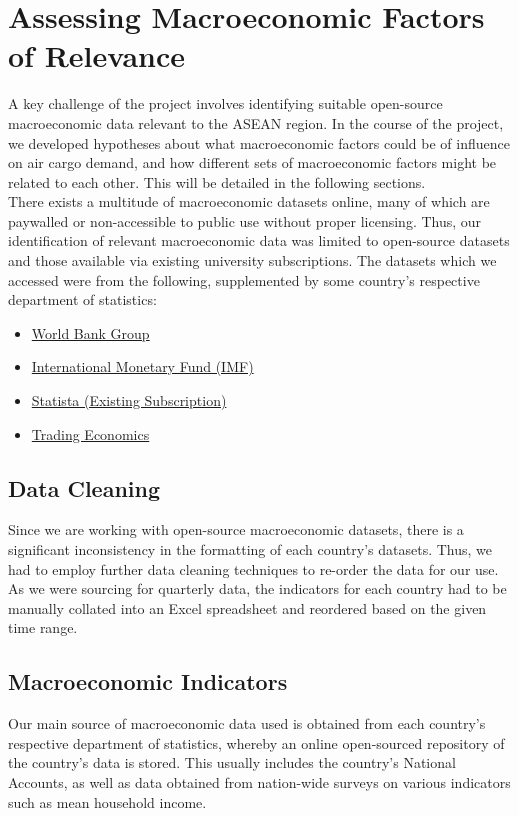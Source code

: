 \documentclass{article}
\begin{document}
\newpage

\section{Assessing Macroeconomic Factors of Relevance}

A key challenge of the project involves identifying suitable open-source macroeconomic data relevant to the ASEAN region. In the course of the project, we developed hypotheses about what macroeconomic factors could be of influence on air cargo demand, and how different sets of macroeconomic factors might be related to each other. This will be detailed in the following sections. \\

\noindent There exists a multitude of macroeconomic datasets online, many of which are paywalled or non-accessible to public use without proper licensing. Thus, our identification of relevant macroeconomic data was limited to open-source datasets and those available via existing university subscriptions. The datasets which we accessed were from the following, supplemented by some country's respective department of statistics:

\begin{itemize}
    \item \href{https://data.worldbank.org/}{World Bank Group} 
    \item \href{https://data.imf.org}{International Monetary Fund (IMF)}
    \item \href{https://statista.com}{Statista (Existing Subscription)}
    \item \href{https://tradingeconomics.com/}{Trading Economics}
\end{itemize} 

\subsection{Data Cleaning}
Since we are working with open-source macroeconomic datasets, there is a significant inconsistency in the formatting of each country's datasets. Thus, we had to employ further data cleaning techniques to re-order the data for our use. As we were sourcing for quarterly data, the indicators for each country had to be manually collated into an Excel spreadsheet and reordered based on the given time range.

\subsection{Macroeconomic Indicators}
Our main source of macroeconomic data used is obtained from each country's respective department of statistics, whereby an online open-sourced repository of the country's data is stored. This usually includes the country's National Accounts, as well as data obtained from nation-wide surveys on various indicators such as mean household income. \\
\end{document}
